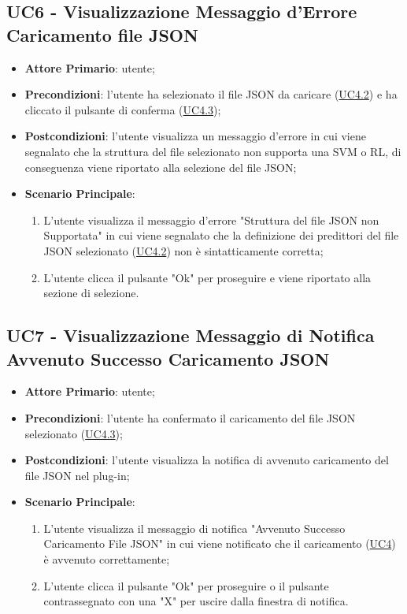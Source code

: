 	
	\label{par:UC6}
	\subsection{UC6 - Visualizzazione Messaggio d'Errore Caricamento file JSON }
		\begin{itemize}
			\item\textbf{Attore Primario}: utente;
			\item\textbf{Precondizioni}: l’utente ha selezionato il file JSON da caricare (\hyperref[par:UC4.2]{UC4.2}) e ha cliccato il pulsante di conferma (\hyperref[par:UC4.3]{UC4.3});
			\item\textbf{Postcondizioni}: l’utente visualizza un messaggio d'errore in cui viene segnalato che la struttura del file selezionato non supporta una SVM o RL, di conseguenza viene riportato alla selezione del file JSON; 
			\item\textbf{Scenario Principale}: 
				\begin{enumerate} 
					\item L’utente visualizza il messaggio d'errore "Struttura del file JSON non Supportata" in cui viene segnalato che la definizione dei predittori del file JSON selezionato (\hyperref[par:UC4.2]{UC4.2}) non è sintatticamente corretta;
					\item L'utente clicca il pulsante "Ok" per proseguire e viene riportato alla sezione di selezione.
				\end{enumerate}
		\end{itemize}	

	
	\label{par:UC7}
	\subsection{UC7 - Visualizzazione Messaggio di Notifica Avvenuto Successo Caricamento JSON}
		\begin{itemize}
			\item\textbf{Attore Primario}: utente;
			\item\textbf{Precondizioni}: l’utente ha confermato il caricamento del file JSON selezionato  (\hyperref[par:UC4.3]{UC4.3});
			\item\textbf{Postcondizioni}: l’utente visualizza la notifica di avvenuto caricamento del file JSON nel plug-in; 
			\item\textbf{Scenario Principale}: 
				\begin{enumerate} 
					\item L’utente visualizza il messaggio di notifica "Avvenuto Successo Caricamento File JSON" in cui viene notificato che il caricamento (\hyperref[par:UC4]{UC4}) è avvenuto correttamente;
					\item L'utente clicca il pulsante "Ok" per proseguire o il pulsante contrassegnato con una "X" per uscire dalla finestra di notifica.		
				\end{enumerate}		
		\end{itemize}

